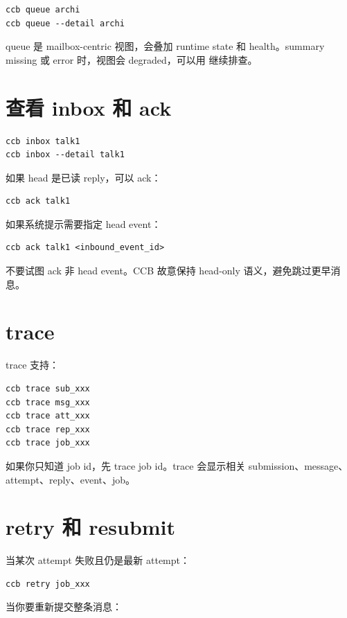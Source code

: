 \begin{lstlisting}
ccb queue archi
ccb queue --detail archi
\end{lstlisting}

queue 是 mailbox-centric 视图，会叠加 runtime state 和 health。summary missing 或 error 时，视图会 degraded，可以用  继续排查。

\section{查看 inbox 和 ack}

\begin{lstlisting}
ccb inbox talk1
ccb inbox --detail talk1
\end{lstlisting}

如果 head 是已读 reply，可以 ack：

\begin{lstlisting}
ccb ack talk1
\end{lstlisting}

如果系统提示需要指定 head event：

\begin{lstlisting}
ccb ack talk1 <inbound_event_id>
\end{lstlisting}

不要试图 ack 非 head event。CCB 故意保持 head-only 语义，避免跳过更早消息。

\section{trace}

trace 支持：

\begin{lstlisting}
ccb trace sub_xxx
ccb trace msg_xxx
ccb trace att_xxx
ccb trace rep_xxx
ccb trace job_xxx
\end{lstlisting}

如果你只知道 job id，先 trace job id。trace 会显示相关 submission、message、attempt、reply、event、job。

\section{retry 和 resubmit}

当某次 attempt 失败且仍是最新 attempt：

\begin{lstlisting}
ccb retry job_xxx
\end{lstlisting}

当你要重新提交整条消息：

